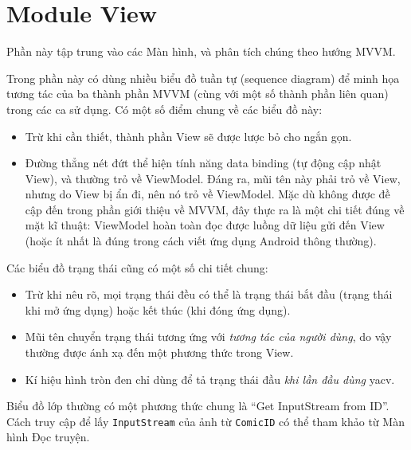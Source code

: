 \documentclass[../../../../thesis]{subfiles}
\begin{document}
\section{Module View}\label{sec:module-view}

Phần này tập trung vào các Màn hình, và phân tích chúng theo hướng MVVM.

Trong phần này có dùng nhiều biểu đồ tuần tự (sequence diagram) để minh họa
tương tác của ba thành phần MVVM (cùng với một số thành phần liên quan) trong
các ca sử dụng. Có một số điểm chung về các biểu đồ này:

\begin{itemize}
    \item
          Trừ khi cần thiết, thành phần View sẽ được lược bỏ cho ngắn gọn.
    \item
          Đường thẳng nét đứt thể hiện tính năng data binding (tự động cập nhật
          View), và thường trỏ về ViewModel. Đáng ra, mũi tên này phải trỏ về
          View, nhưng do View bị ẩn đi, nên nó trỏ về ViewModel. Mặc dù không được
          đề cập đến trong phần giới thiệu về MVVM, đây thực ra là một chi tiết
          đúng về mặt kĩ thuật: ViewModel hoàn toàn đọc được luồng dữ liệu gửi đến
          View (hoặc ít nhất là đúng trong cách viết ứng dụng Android thông
          thường).
\end{itemize}

Các biểu đồ trạng thái cũng có một số chi tiết chung:

\begin{itemize}
    \item
          Trừ khi nêu rõ, mọi trạng thái đều có thể là trạng thái bắt đầu (trạng
          thái khi mở ứng dụng) hoặc kết thúc (khi đóng ứng dụng).
    \item
          Mũi tên chuyển trạng thái tương ứng với \emph{tương tác của người dùng},
          do vậy thường được ánh xạ đến một phương thức trong View.
    \item
          Kí hiệu hình tròn đen chỉ dùng để tả trạng thái đầu \emph{khi lần đầu
              dùng} yacv.
\end{itemize}

Biểu đồ lớp thường có một phương thức chung là ``Get InputStream from ID''. Cách
truy cập để lấy \texttt{InputStream} của ảnh từ \texttt{ComicID} có thể tham
khảo từ Màn hình Đọc truyện.


\end{document}
